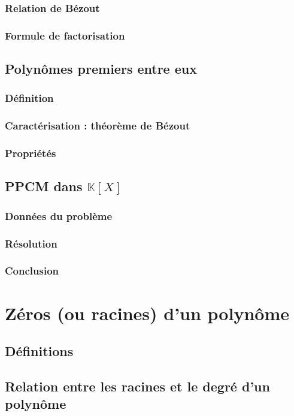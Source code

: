 \documentclass[12pt,a4paper,french]{book}
\begin{document}
			\subsubsection{Relation de Bézout}
			\subsubsection{Formule de factorisation}
		\subsection{Polynômes premiers entre eux}
			\subsubsection{Définition}
			\subsubsection{Caractérisation : théorème de Bézout}
			\subsubsection{Propriétés}
		\subsection{PPCM dans $\mathbb{K}[X]$}
			\subsubsection{Données du problème}
			\subsubsection{Résolution}
			\subsubsection{Conclusion}
	\section{Zéros (ou racines) d'un polynôme}
		\subsection{Définitions}
		\subsection{Relation entre les racines et le degré d'un polynôme}
\end{document}
